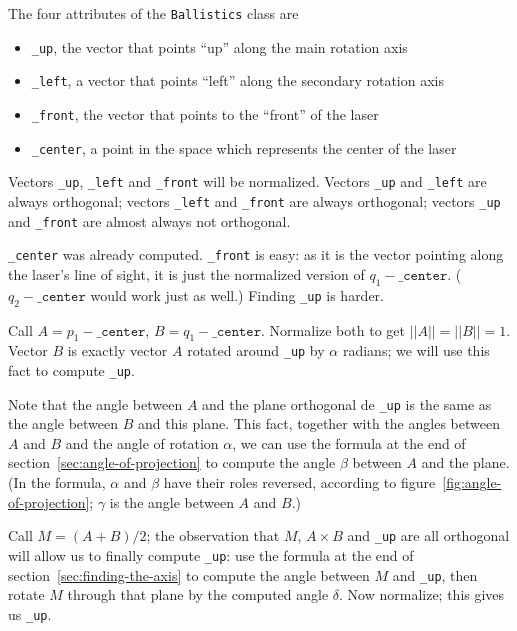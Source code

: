 \documentclass{article}
\newcommand\class[1]{\texttt{#1}}
\newcommand\attribute[1]{\texttt{#1}}
\begin{document}
The four attributes of the \class{Ballistics} class are
\begin{itemize}
    \item \attribute{\_up},
        the vector that points ``up'' along the main rotation axis
    \item \attribute{\_left},
        a vector that points ``left'' along the secondary rotation axis
    \item \attribute{\_front},
        the vector that points to the ``front'' of the laser
    \item \attribute{\_center},
        a point in the space which represents the center of the laser
\end{itemize}
Vectors \attribute{\_up}, \attribute{\_left} and \attribute{\_front} will be normalized.
Vectors \attribute{\_up} and \attribute{\_left} are always orthogonal;
vectors \attribute{\_left} and \attribute{\_front} are always orthogonal;
vectors \attribute{\_up} and \attribute{\_front} are almost always not orthogonal.

\attribute{\_center} was already computed.
\attribute{\_front} is easy: as it is the vector pointing along
the laser's line of sight,
it is just the normalized version of $q_1 - \attribute{\_center}$.
($q_2 - \attribute{\_center}$ would work just as well.)
Finding \attribute{\_up} is harder.

Call $A = p_1 - \attribute{\_center}$, $B = q_1 - \attribute{\_center}$.
Normalize both to get $||A|| = ||B|| = 1$.
Vector $B$ is exactly vector $A$ rotated around \attribute{\_up}
by $\alpha$ radians;
we will use this fact to compute \attribute{\_up}.

Note that the angle between $A$ and the plane orthogonal de \attribute{\_up}
is the same as the angle between $B$ and this plane.
This fact, together with the angles between $A$ and $B$
and the angle of rotation $\alpha$,
we can use the formula at the end of section~\ref{sec:angle-of-projection}
to compute the angle $\beta$ between $A$ and the plane.
(In the formula, $\alpha$ and $\beta$ have their roles reversed,
according to figure~\ref{fig:angle-of-projection};
$\gamma$ is the angle between $A$ and $B$.)

Call $M = (A + B)/2$; the observation that $M$,
$A \times B$ and \attribute{\_up} are all orthogonal
will allow us to finally compute \attribute{\_up}:
use the formula at the end of section~\ref{sec:finding-the-axis}
to compute the angle between $M$ and \attribute{\_up},
then rotate $M$ through that plane by the computed angle $\delta$.
Now normalize;
this gives us \attribute{\_up}.
\end{document}
